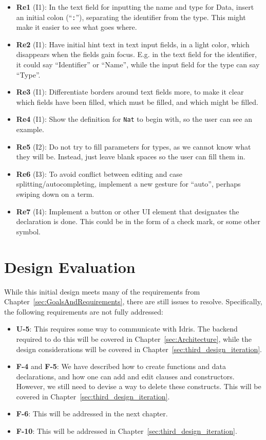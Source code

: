 \begin{itemize}
	\item \textbf{Re1} (I1): In the text field for inputting the name and type for Data, insert an initial colon (``\texttt{:}''), separating the identifier from the type. This might make it easier to see what goes where.
	\item \textbf{Re2} (I1): Have initial hint text in text input fields, in a light color, which disappears when the fields gain focus. E.g. in the text field for the identifier, it could say ``Identifier'' or ``Name'', while the input field for the type can say ``Type''.
	\item \textbf{Re3} (I1): Differentiate borders around text fields more, to make it clear which fields have been filled, which must be filled, and which might be filled.
	\item \textbf{Re4} (I1): Show the definition for \texttt{Nat} to begin with, so the user can see an example.
	\item \textbf{Re5} (I2): Do not try to fill parameters for types, as we cannot know what they will be. Instead, just leave blank spaces so the user can fill them in.
	\item \textbf{Re6} (I3): To avoid conflict between editing and case splitting/autocompleting, implement a new gesture for ``auto'', perhaps swiping down on a term.
	\item \textbf{Re7} (I4): Implement a button or other UI element that designates the declaration is done. This could be in the form of a check mark, or some other symbol.
\end{itemize}


\section{Design Evaluation}
\label{subsec:first_design_evaluation}
While this initial design meets many of the requirements from Chapter~\ref{sec:GoalsAndRequirements}, there are still issues to resolve.
Specifically, the following requirements are not fully addressed:
\begin{itemize}
	\item \textbf{U-5}: This requires some way to communicate with Idris. The backend required to do this will be covered in Chapter~\ref{sec:Architecture}, while the design considerations will be covered in
	Chapter~\ref{sec:third_design_iteration}.
	\item \textbf{F-4} and \textbf{F-5}: We have described how to create functions and data declarations, and how one can add and edit clauses and constructors. However, we still need to devise a way to delete these constructs. This will be covered in Chapter~\ref{sec:third_design_iteration}.
	\item \textbf{F-6}: This will be addressed in the next chapter.
	\item \textbf{F-10}: This will be addressed in Chapter~\ref{sec:third_design_iteration}.
\end{itemize}

